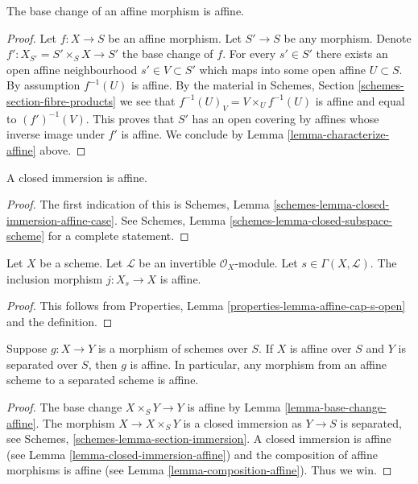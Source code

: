 \begin{lemma}
\label{lemma-base-change-affine}
The base change of an affine morphism is affine.
\end{lemma}

\begin{proof}
Let $f : X \to S$ be an affine morphism. Let $S' \to S$ be any morphism.
Denote $f' : X_{S'} = S' \times_S X \to S'$ the base change of $f$.
For every $s' \in S'$ there exists an open affine neighbourhood
$s' \in V \subset S'$ which maps into some open affine $U \subset S$.
By assumption $f^{-1}(U)$ is affine. By the material in
Schemes, Section \ref{schemes-section-fibre-products} we see
that $f^{-1}(U)_{V} = V \times_U f^{-1}(U)$ is affine and equal
to $(f')^{-1}(V)$. This proves that $S'$ has an open covering by
affines whose inverse image under $f'$ is affine. We conclude
by Lemma \ref{lemma-characterize-affine} above.
\end{proof}

\begin{lemma}
\label{lemma-closed-immersion-affine}
A closed immersion is affine.
\end{lemma}

\begin{proof}
The first indication of this is
Schemes, Lemma \ref{schemes-lemma-closed-immersion-affine-case}.
See Schemes, Lemma \ref{schemes-lemma-closed-subspace-scheme}
for a complete statement.
\end{proof}

\begin{lemma}
\label{lemma-affine-s-open}
Let $X$ be a scheme.
Let $\mathcal{L}$ be an invertible $\mathcal{O}_X$-module.
Let $s \in \Gamma(X, \mathcal{L})$.
The inclusion morphism $j : X_s \to X$ is affine.
\end{lemma}

\begin{proof}
This follows from Properties, Lemma \ref{properties-lemma-affine-cap-s-open}
and the definition.
\end{proof}

\begin{lemma}
\label{lemma-affine-permanence}
Suppose $g : X \to Y$ is a morphism of schemes over $S$.
If $X$ is affine over $S$ and $Y$ is separated over $S$,
then $g$ is affine. In particular, any morphism from an
affine scheme to a separated scheme is affine.
\end{lemma}

\begin{proof}
The base change $X \times_S Y \to Y$ is affine by
Lemma \ref{lemma-base-change-affine}.
The morphism $X \to X \times_S Y$ is
a closed immersion as $Y \to S$ is separated, see
Schemes, \ref{schemes-lemma-section-immersion}.
A closed immersion is affine (see Lemma \ref{lemma-closed-immersion-affine})
and the composition of affine morphisms is affine
(see Lemma \ref{lemma-composition-affine}). Thus we win.
\end{proof}

